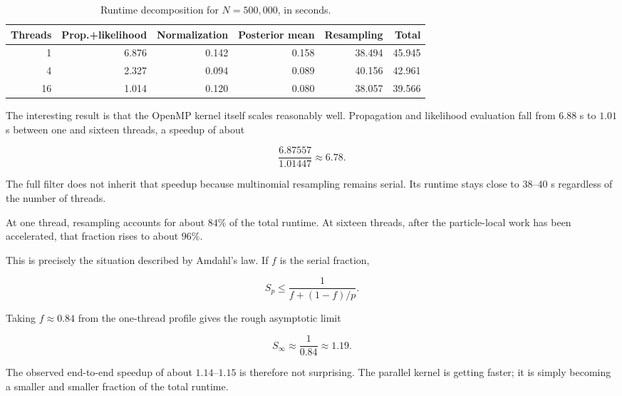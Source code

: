 \begin{table}[H]
	\centering
	\caption{Runtime decomposition for \(N=500{,}000\), in seconds.}
	\label{tab:stage1-runtime-breakdown}
	\begin{tabular}{rrrrrr}
		\toprule
		Threads &
		Prop.+likelihood &
		Normalization &
		Posterior mean &
		Resampling &
		Total \\
		\midrule
		1  & 6.876 & 0.142 & 0.158 & 38.494 & 45.945 \\
		4  & 2.327 & 0.094 & 0.089 & 40.156 & 42.961 \\
		16 & 1.014 & 0.120 & 0.080 & 38.057 & 39.566 \\
		\bottomrule
	\end{tabular}
\end{table}

The interesting result is that the OpenMP kernel itself scales
reasonably well. Propagation and likelihood evaluation fall from
\(6.88\) s to \(1.01\) s between one and sixteen threads, a speedup of
about

\begin{equation}
	\frac{6.87557}{1.01447}\approx6.78.
\end{equation}

The full filter does not inherit that speedup because multinomial
resampling remains serial. Its runtime stays close to \(38\)--\(40\) s
regardless of the number of threads.

At one thread, resampling accounts for about \(84\%\) of the total
runtime. At sixteen threads, after the particle-local work has been
accelerated, that fraction rises to about \(96\%\).

This is precisely the situation described by Amdahl's law. If \(f\) is
the serial fraction,

\begin{equation}
	S_p
	\leq
	\frac{1}{f+(1-f)/p}.
\end{equation}

Taking \(f\approx0.84\) from the one-thread profile gives the rough
asymptotic limit

\begin{equation}
	S_\infty
	\approx
	\frac{1}{0.84}
	\approx1.19.
\end{equation}

The observed end-to-end speedup of about \(1.14\)--\(1.15\) is therefore
not surprising. The parallel kernel is getting faster; it is simply
becoming a smaller and smaller fraction of the total runtime.


